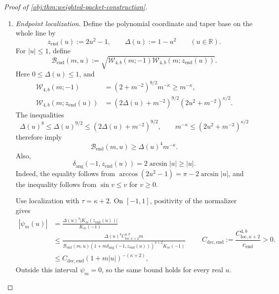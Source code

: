 \begin{proof}[Proof of \cref{obj:thm:weighted-packet-construction}]
\begin{enumerate}
\item \emph{Endpoint localization.}
Define the polynomial coordinate and taper base on the whole line by
\[
z_{\mathrm{end}}(u):=2u^2-1,
\qquad
\Delta(u):=1-u^2
\qquad(u\in\mathbb R).
\]
For \(|u|\le1\), define
\[
\mathcal B_{\mathrm{end}}(m,u)
:=
\sqrt{\mathcal W_{4,b}(m;-1)
      \mathcal W_{4,b}(m;z_{\mathrm{end}}(u))}.
\]
Here \(0\le\Delta(u)\le1\), and
\[
\begin{split}
\mathcal W_{4,b}(m;-1)
&=(2+m^{-2})^{9/2}m^{-\kappa}
\ge m^{-\kappa},\\
\mathcal W_{4,b}(m;z_{\mathrm{end}}(u))
&=(2\Delta(u)+m^{-2})^{9/2}
  (2u^2+m^{-2})^{\kappa/2}.
\end{split}
\]
The inequalities
\[
\Delta(u)^8
\le\Delta(u)^{9/2}
\le(2\Delta(u)+m^{-2})^{9/2},
\qquad
m^{-\kappa}\le(2u^2+m^{-2})^{\kappa/2}
\]
therefore imply
\[
\mathcal B_{\mathrm{end}}(m,u)
\ge\Delta(u)^4m^{-\kappa}.
\]
Also,
\[
\delta_{\mathrm{ang}}(-1,z_{\mathrm{end}}(u))
=2\arcsin|u|
\ge|u|.
\]
Indeed, the equality follows from
\(\arccos(2u^2-1)=\pi-2\arcsin|u|\), and the inequality follows from
\(\sin v\le v\) for \(v\ge0\).

Use localization with \(\tau=\kappa+2\). On \([-1,1]\), positivity of the normalizer gives
\[
\begin{split}
|\psi_m(u)|
&=
\frac{\Delta(u)^4|K_m(z_{\mathrm{end}}(u))|}{K_m(-1)}\\
&\le
\frac{\Delta(u)^4 C_{\mathrm{loc},\kappa+2}^{4,b}m}
{\mathcal B_{\mathrm{end}}(m,u)
 (1+m\delta_{\mathrm{ang}}(-1,z_{\mathrm{end}}(u)))^{\kappa+2}
 K_m(-1)}\\
&\le
C_{\mathrm{dec,end}}(1+m|u|)^{-(\kappa+2)},
\end{split}
\qquad
C_{\mathrm{dec,end}}
:=
\frac{C_{\mathrm{loc},\kappa+2}^{4,b}}{c_{\mathrm{end}}}>0.
\]
Outside this interval \(\psi_m=0\), so the same bound holds for every real \(u\).


\end{enumerate}
\end{proof}
